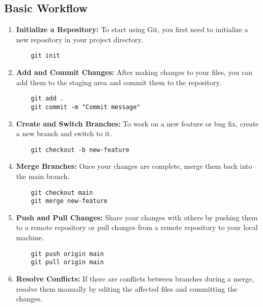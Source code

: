 \documentclass[12pt,a4paper]{report}
\begin{document}
\subsection{Basic Workflow}

\begin{enumerate}
    \item \textbf{Initialize a Repository:} To start using Git, you first need to initialize a new repository in your project directory.
    
    \begin{verbatim}
    git init
    \end{verbatim}
    
    \item \textbf{Add and Commit Changes:} After making changes to your files, you can add them to the staging area and commit them to the repository.
    
    \begin{verbatim}
    git add .
    git commit -m "Commit message"
    \end{verbatim}
    
    \item \textbf{Create and Switch Branches:} To work on a new feature or bug fix, create a new branch and switch to it.
    
    \begin{verbatim}
    git checkout -b new-feature
    \end{verbatim}
    
    \item \textbf{Merge Branches:} Once your changes are complete, merge them back into the main branch.
    
    \begin{verbatim}
    git checkout main
    git merge new-feature
    \end{verbatim}
    
    \item \textbf{Push and Pull Changes:} Share your changes with others by pushing them to a remote repository or pull changes from a remote repository to your local machine.
    
    \begin{verbatim}
    git push origin main
    git pull origin main
    \end{verbatim}
    
    \item \textbf{Resolve Conflicts:} If there are conflicts between branches during a merge, resolve them manually by editing the affected files and committing the changes.
\end{enumerate}
\end{document}
